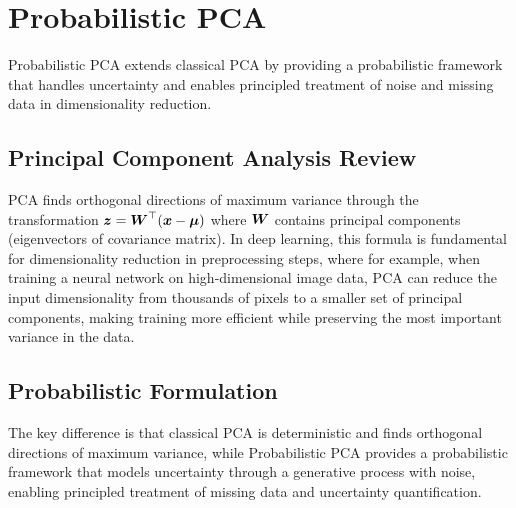 
\section{Probabilistic PCA }
\label{sec:prob-pca}

Probabilistic PCA extends classical PCA by providing a probabilistic framework that handles uncertainty and enables principled treatment of noise and missing data in dimensionality reduction.

\subsection{Principal Component Analysis Review}

PCA finds orthogonal directions of maximum variance through the transformation $\boldsymbol{z} = \boldsymbol{W}^\top (\boldsymbol{x} - \boldsymbol{\mu})$ where $\boldsymbol{W}$ contains principal components (eigenvectors of covariance matrix). In deep learning, this formula is fundamental for dimensionality reduction in preprocessing steps, where for example, when training a neural network on high-dimensional image data, PCA can reduce the input dimensionality from thousands of pixels to a smaller set of principal components, making training more efficient while preserving the most important variance in the data.

\subsection{Probabilistic Formulation}

\begin{remark}
The key difference is that classical PCA is deterministic and finds orthogonal directions of maximum variance, while Probabilistic PCA provides a probabilistic framework that models uncertainty through a generative process with noise, enabling principled treatment of missing data and uncertainty quantification.
\end{remark}

